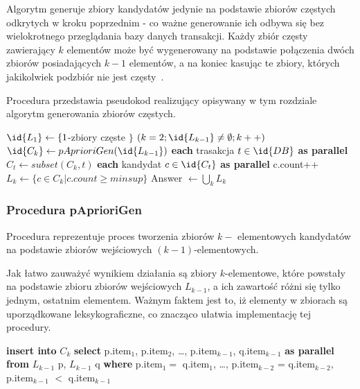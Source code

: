 Algorytm generuje zbiory kandydatów jedynie na podstawie zbiorów częstych odkrytych w kroku poprzednim - co ważne generowanie ich odbywa się bez wielokrotnego przeglądania bazy danych transakcji. Każdy zbiór częsty zawierający $k$ elementów może być wygenerowany na podstawie połączenia dwóch zbiorów posiadających $k-1$ elementów, a na koniec kasując te zbiory, których jakikolwiek podzbiór nie jest częsty~\cite{Apriori:Main}.

Procedura  przedstawia pseudokod realizujący opisywany w tym rozdziale algorytm generowania zbiorów częstych.

\begin{codebox}
	\label{apriori:listing}
	\li $\id{L_1} \gets \lbrace 1$-zbiory częste $\rbrace$
		\li \For $(k = 2; \id{L_{k-1}} \neq \emptyset; k++)$
		\li \Do
			 $\id{C_k} \gets pAprioriGen(\id{L_{k-1}})$
			\li \For \textbf{each} trasakcja $t \in \id{DB}$ \textbf{as parallel}
			\li \Do
					$C_t \gets subset(C_k, t)$
					\li \For \textbf{each} kandydat $c \in \id{C_t}$ \textbf{as parallel}
					\li \Do c.count++
					\End
				\End
			\li $L_k \gets \lbrace c \in C_k | c.count \geq minsup \rbrace$	
		\End
	\li Answer $\gets \bigcup_k L_k $
\end{codebox}

\subsubsection{Procedura pAprioriGen}

Procedura  reprezentuje proces tworzenia zbiorów $k-$ elementowych kandydatów na podstawie zbiorów wejściowych $(k-1)$-elementowych. 

Jak łatwo zauważyć wynikiem działania  są zbiory $k$-elementowe, które powstały na podstawie zbioru zbiorów wejściowych $L_{k-1}$, a ich zawartość różni się tylko jednym, ostatnim elementem. Ważnym faktem jest to, iż elementy w zbiorach są uporządkowane leksykograficzne, co znacząco ułatwia implementację tej procedury.

\begin{codebox}
	\li \textbf{insert into} $C_k$
	\li \textbf{select} p.item$_1$, p.item$_2$, \dots, p.item$_{k-1}$, q.item$_{k-1}$ \textbf{as parallel}
	\li \textbf{from} $L_{k-1}$ p, $L_{k-1}$ q
	\li \textbf{where} p.item$_1 = $ q.item$_1$, \dots, p.item$_{k-2}$ = q.item$_{k-2}$, p.item$_{k-1}$ $<$ q.item$_{k-1}$
\end{codebox}


